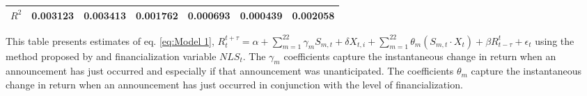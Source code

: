 \begin{sidewaystable}
{\begin{tabular}{@{}lllllllllllll@{}}
                                 \\ \textbf{$R^2$}             &\multicolumn{2}{c}{ 0.003123 }                                                 & \multicolumn{2}{c}{ 0.003413 }                                                 & \multicolumn{2}{c}{ 0.001762 }                                                 & \multicolumn{2}{c}{ 0.000693 }                                                 & \multicolumn{2}{c}{ 0.000439 }                                                   & \multicolumn{2}{c}{ 0.002058 }                                                 \\ \bottomrule 
\end{tabular}
}
\begin{tablenotes}\item 
    \singlespacing
    \footnotesize
    This table presents estimates of eq. \ref{eq:Model 1}, $R_{t}^{t+\tau}=\alpha+\sum_{m=1}^{22} \gamma_m S_{m,t}+ \delta X_{t,i} + \sum_{m=1}^{22} \theta_m (S_{m,t} \cdot X_t)+\beta R_{t-\tau}^{t}+\epsilon_{t}$ using the method proposed by \citet{kurov2019price} and financialization variable $NLS_t$. The $\gamma_m$ coefficients capture the instantaneous change in return when an announcement has just occurred and especially if that announcement was unanticipated. The coefficients $\theta_m$ capture the instantaneous change in return when an announcement has just occurred in conjunction with the level of financialization.
\end{tablenotes}
\end{sidewaystable}




